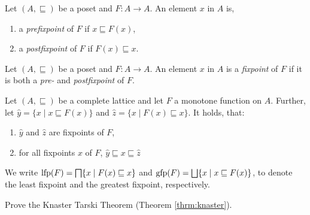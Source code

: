 \begin{definition}
Let $(A, \sqsubseteq)$ be a poset and $F: A \to A$. An element $x$ in $A$ is,
\begin{enumerate}
  \item a \emph{prefixpoint} of $F$ if $x \sqsubseteq F(x)$,
  \item a \emph{postfixpoint} of $F$ if $F(x) \sqsubseteq x$.
\end{enumerate}
\end{definition}

\begin{definition}[Fixpoint]
Let $(A, \sqsubseteq)$ be a poset and $F: A \to A$. An element $x$ in $A$ is a \emph{fixpoint} of $F$ if it is both a \emph{pre-} and \emph{postfixpoint} of $F$.
\end{definition}

\begin{theorem}
\label{thrm:knaster}
    Let $(A,\sqsubseteq)$ be a complete lattice and let $F$ a monotone function on $A$.
    Further, let $\hat{y} = \{x \mid x \sqsubseteq F(x)\}$ and $\hat{z} = \{x \mid F(x) \sqsubseteq x\}$.
    It holds, that:
    \begin{enumerate}
      \item $\hat{y}$ and $\hat{z}$ are fixpoints of $F$,
      \item for all fixpoints $x$ of $F$, $\hat{y} \sqsubseteq x \sqsubseteq \hat{z}$
    \end{enumerate}
\end{theorem}

{\flushleft We write $\mathrm{lfp}(F) = \bigsqcap\{x \mid F(x)\sqsubseteq x\}$ and $\mathrm{gfp}(F) = \bigsqcup\{x \mid x \sqsubseteq F(x)\}$, to denote the least fixpoint and the greatest fixpoint, respectively.}

\begin{exercise}
        Prove the Knaster Tarski Theorem (Theorem \ref{thrm:knaster}).
\end{exercise}


